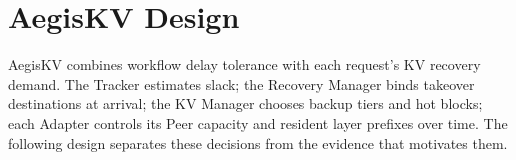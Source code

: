 \section{AegisKV Design}
\label{sec:design}

AegisKV combines workflow delay tolerance with each request's KV
recovery demand. The Tracker estimates slack; the Recovery Manager binds
takeover destinations at arrival; the KV Manager chooses backup tiers
and hot blocks; each Adapter controls its Peer capacity and resident
layer prefixes over time. The following design
separates these decisions from the evidence that motivates them.








